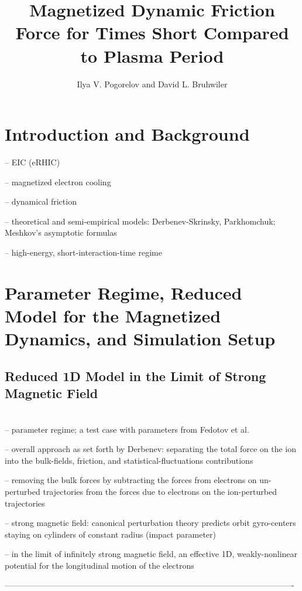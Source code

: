 \documentclass[12pt, reqno]{amsart}
\title{Magnetized Dynamic Friction Force for Times Short Compared to Plasma Period}
\author{Ilya V. Pogorelov and David L. Bruhwiler}
\date{} %
\begin{document}
\maketitle
\tableofcontents

\section{Introduction and Background}


-- EIC (eRHIC) 

-- magnetized electron cooling 

-- dynamical friction 

-- theoretical and semi-empirical models: Derbenev-Skrinsky, Parkhomchuk;  Meshkov's asymptotic formulas 

-- high-energy, short-interaction-time regime 

\section{Parameter Regime, Reduced Model for the Magnetized Dynamics, and Simulation Setup}

\subsection{Reduced 1D Model in the Limit of Strong Magnetic Field } 
~\\
-- parameter regime; a test case with parameters from Fedotov et al. 

-- overall approach as set forth by Derbenev: separating the total force on the ion into the bulk-fields, friction, and statistical-fluctuations contributions 

-- removing the bulk forces by subtracting the forces from electrons on un-perturbed trajectories from the forces due to electrons on the ion-perturbed trajectories 

-- strong magnetic field: canonical perturbation theory predicts orbit gyro-centers staying on cylinders of constant radius (impact parameter) 

-- in the limit of infinitely strong magnetic field, an effective 1D, weakly-nonlinear potential for the longitudinal motion of the electrons 

---------------------------------------------------------------------------------------------------------- 
\end{document}
